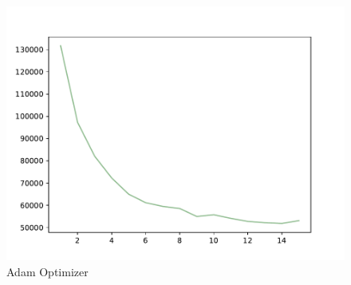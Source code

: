 \documentclass{article}
\begin{document}
\begin{figure}[!h]
{\begin{minipage}{0.21\linewidth}
  \includegraphics[scale=0.23]{imgs/test_loss_adam.pdf}
  \end{minipage}
}
\quad
{}
\caption{ Adam Optimizer}
\label{adam}
\end{figure}
\end{document}

